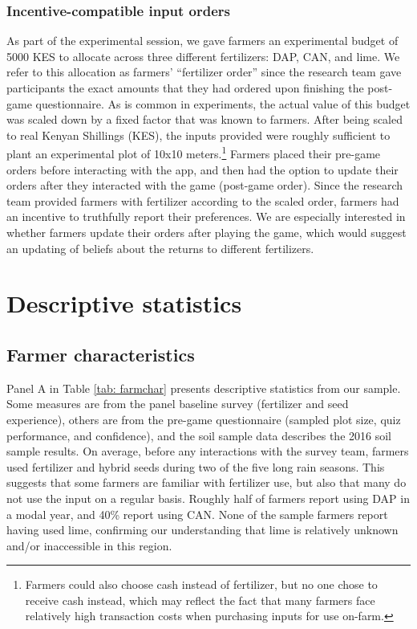 \documentclass[12pt,letterpaper]{article}
\begin{document}
\subsubsection{Incentive-compatible input orders}

As part of the experimental session, we gave farmers an experimental budget of 5000 KES to allocate across three different fertilizers: DAP, CAN, and lime. We refer to this allocation as farmers' ``fertilizer order'' since the research team gave participants the exact amounts that they had ordered upon finishing the post-game questionnaire. As is common in experiments, the actual value of this budget was scaled down by a fixed factor that was known to farmers. After being scaled to real Kenyan Shillings (KES), the inputs provided were roughly sufficient to plant an experimental plot of 10x10 meters.\footnote{Farmers could also choose cash instead of fertilizer, but no one chose to receive cash instead, which may reflect the fact that many farmers face relatively high transaction costs when purchasing inputs for use on-farm.} Farmers placed their pre-game orders before interacting with the app, and then had the option to update their orders after they interacted with the game (post-game order). Since the research team provided farmers with fertilizer according to the scaled order, farmers had an incentive to truthfully report their preferences. We are especially interested in whether farmers update their orders after playing the game, which would suggest an updating of beliefs about the returns to different fertilizers.

\section{Descriptive statistics}\label{sec:descriptive_stats}

\subsection{Farmer characteristics}

Panel A in Table \ref{tab: farmchar} presents descriptive statistics from our sample. Some measures are from the panel baseline survey (fertilizer and seed experience), others are from the pre-game questionnaire (sampled plot size, quiz performance, and confidence), and the soil sample data describes the 2016 soil sample results. On average, before any interactions with the survey team, farmers used fertilizer and hybrid seeds during two of the five long rain seasons. This suggests that some farmers are familiar with fertilizer use, but also that many do not use the input on a regular basis. Roughly half of farmers report using DAP in a modal year, and 40\% report using CAN. None of the sample farmers report having used lime, confirming our understanding that lime is relatively unknown and/or inaccessible in this region.
\end{document}
